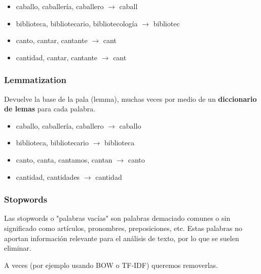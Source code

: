 \documentclass[../main.tex]{subfiles}
\begin{document}
            \begin{itemize}
                \item caballo, caballería, caballero $\rightarrow$ caball
                \item biblioteca, bibliotecario, bibliotecología $\rightarrow$ bibliotec
                \item canto, cantar, cantante $\rightarrow$ cant
                \item cantidad, cantar, cantante $\rightarrow$ cant
            \end{itemize}

        \subsubsection{Lemmatization}
            Devuelve la base de la pala (lemma), muchas veces por medio de un \textbf{diccionario de lemas} para cada palabra.

            \begin{itemize}
                \item caballo, caballería, caballero $\rightarrow$ caballo
                \item biblioteca, bibliotecario $\rightarrow$ biblioteca
                \item canto, canta, cantamos, cantan $\rightarrow$ canto
                \item cantidad, cantidades $\rightarrow$ cantidad
            \end{itemize}

        \subsubsection{Stopwords}
            Las stopwords o "palabras vacías" son palabras demaciado comunes o sin significado como artículos, pronombres, preposiciones, etc. Estas palabras no aportan información relevante para el análisis de texto, por lo que se suelen eliminar.

            A veces (por ejemplo usando BOW o TF-IDF) queremos removerlas.
\end{document}
